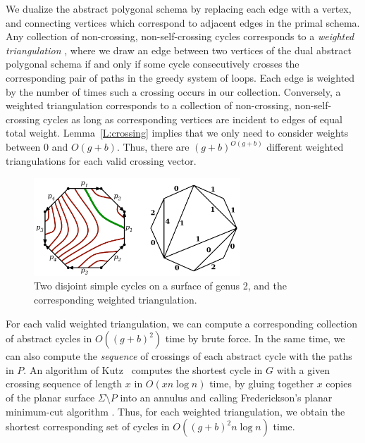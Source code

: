\documentclass{sig-alternate}
\def\note#1{\EMPH{\color{red} #1}}
\begin{document}
We dualize the abstract polygonal schema by replacing each edge with a vertex, and connecting vertices which correspond to adjacent edges in the primal schema.  Any collection of non-crossing, non-self-crossing cycles corresponds to a \emph{weighted triangulation} \cite{ccelw-scsih-08}, where we draw an edge between two vertices of the dual abstract polygonal schema if and only if some cycle consecutively crosses the corresponding pair of paths in the greedy system of loops.  Each edge is weighted by the number of times such a crossing occurs in our collection.  Conversely, a weighted triangulation corresponds to a collection of non-crossing, non-self-crossing cycles as long as corresponding vertices are incident to edges of equal total weight.  Lemma~\ref{L:crossing} implies that we only need to consider weights between 0 and $O(g+b)$.  Thus, there are $(g+b)^{O(g+b)}$ different weighted triangulations for each valid crossing vector.


\begin{figure}[htb]
\centering\includegraphics[height=1.45in]{Fig/triangulation}
\caption{Two disjoint simple cycles on a surface of genus 2, and the corresponding weighted triangulation.}
\end{figure}

For each valid weighted triangulation, we can compute a corresponding collection of abstract cycles in $O((g+b)^2)$ time by brute force.  In the same time, we can also compute the \emph{sequence} of crossings of each abstract cycle with the paths in $P$.  An algorithm of Kutz~\cite{k-csnco-06} computes the shortest cycle in $G$ with a given crossing sequence of length $x$ in $O(x n \log n)$ time, by gluing together $x$ copies of the planar surface $\Sigma\setminus P$ into an annulus and calling Frederickson's planar minimum-cut algorithm \cite{f-faspp-87}.  Thus, for each weighted triangulation, we obtain the shortest corresponding set of cycles in $O((g+b)^2 n \log n)$ time.

\end{document}
